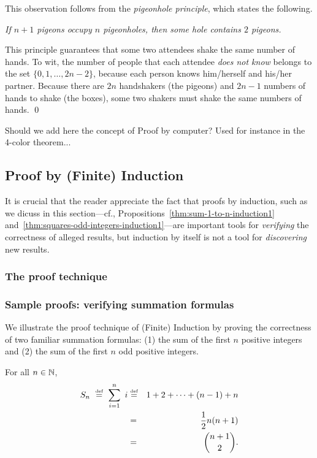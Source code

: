 \medskip

%
This observation follows from the {\it pigeonhole principle}, which
states the following.

{\it If $n+1$ pigeons occupy $n$ pigeonholes, then some hole contains
  $2$ pigeons.}

\noindent
This principle guarantees that some two attendees shake the same
number of hands.  To wit, the number of people that each attendee {\em
  does not know} belongs to the set $\{ 0, 1, \ldots, 2n-2 \}$,
because each person knows him/herself and his/her partner.  Because
there are $2n$ handshakers (the pigeons) and $2n-1$ numbers of hands
to shake (the boxes), some two shakers must shake the same numbers of
hands.  \qed


{\Denis Should we add here the concept of Proof by computer?
Used for instance in the 4-color theorem...}





\subsection{Proof by (Finite) Induction}
\label{sec:Induction}

It is crucial that the reader appreciate the fact that proofs by
induction, such as we dicuss in this section---cf.,
Propositions~\ref{thm:sum-1-to-n-induction1}
and~\ref{thm:squares-odd-integers-induction1}---are important tools for
{\em verifying} the correctness of alleged results, but induction by
itself is not a tool for {\em discovering} new results.


\subsubsection{The proof technique}


\subsubsection{Sample proofs: verifying summation formulas}
\label{sec:Proof-Induction}


We illustrate the proof technique of (Finite) Induction by proving the
correctness of two familiar summation formulas: (1) the sum of the
first $n$ positive integers and (2) the sum of the first $n$ odd
positive integers.

\begin{prop}
\label{thm:sum-1-to-n-induction1}
For all $n \in \mathbb{N}$,
\begin{eqnarray}
\nonumber
S_n \ \stackrel{\mbox{{\tiny def}}}{=} \ \sum_{i=1}^n \ i
 & \stackrel{\mbox{{\tiny def}}}{=} &
 1 + 2 + \cdots + (n-1) + n \\
\label{eq:sum-first-n1}
 & = & {1 \over 2} n (n+1) \\
\nonumber
 & = & {{n+1}  \choose 2}.
\end{eqnarray}
\end{prop}

